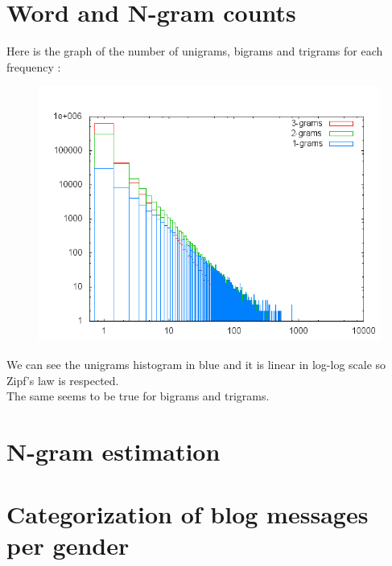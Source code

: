 \documentclass{eplDoc}
\begin{document}
\section{Word and N-gram counts}
Here is the graph of the number of unigrams, bigrams and trigrams for each frequency :
\FloatBarrier
\begin{figure}%
\includegraphics[width=\columnwidth]{ngramsplot.png}%
\caption{}%
\label{}%
\end{figure}
\FloatBarrier

We can see the unigrams histogram in blue and it is linear in log-log scale so Zipf's law is respected. \\ 
The same seems to be true for bigrams and trigrams. 

\section{N-gram estimation}

\section{Categorization of blog messages per gender}
\end{document}
